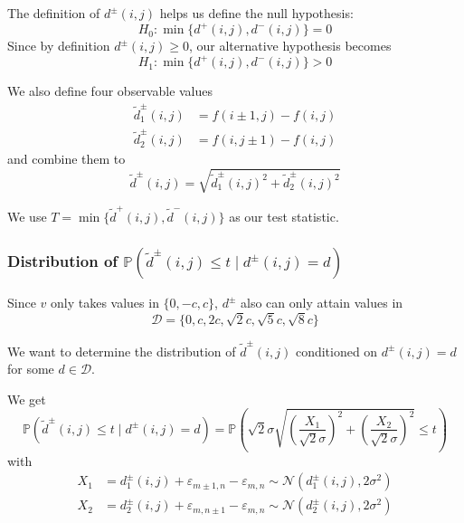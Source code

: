 \documentclass{beamer}
\begin{document}
\begin{frame}
	The definition of $d^\pm(i, j)$ helps us define the null hypothesis:
	\begin{equation*}
		H_0 : \min\{ d^+(i, j), d^-(i, j) \} = 0
	\end{equation*}
	Since by definition $d^\pm(i, j) \geq 0$, our alternative hypothesis becomes
	\begin{equation*}
		H_1 : \min\{ d^+(i, j), d^-(i, j) \} > 0
	\end{equation*}
\end{frame}

\begin{frame}
	We also define four observable values
	\begin{align*}
		\tilde{d}^\pm_1(i, j) &= f(i \pm 1, j) - f(i, j) \\
		\tilde{d}^\pm_2(i, j) &= f(i, j \pm 1) - f(i, j)
	\end{align*}
	and combine them to
	\begin{equation*}\label{d_tilde}
		\tilde{d}^\pm(i, j) = \sqrt{\tilde{d}_1^\pm(i, j)^2 + \tilde{d}_2^\pm(i, j)^2}
	\end{equation*}
	
	We use $T = \min \{ \tilde{d}^+(i, j), \tilde{d}^-(i, j) \}$ as our test statistic.
\end{frame}

\subsubsection{Distribution of $\mathbb{P}(\tilde{d}^\pm(i, j) \leq t \mid d^\pm(i, j) = d)$}

\begin{frame}
	Since $v$ only takes values in $\{ 0, -c, c \}$, $d^\pm$ also can only attain values in
	\begin{equation*}
		\mathcal{D} = \{ 0, c, 2 c, \sqrt{2} c, \sqrt{5} c, \sqrt{8} c \}
	\end{equation*}
	
	We want to determine the distribution of $\tilde{d}^\pm(i, j)$ conditioned on $d^\pm(i, j) = d$ for some $d \in \mathcal{D}$.
\end{frame}

\begin{frame}
	We get
	\begin{equation*}
		\mathbb{P}(\tilde{d}^\pm(i, j) \leq t \mid d^\pm(i, j) = d) = \mathbb{P}\left( \sqrt{2} \sigma \sqrt{\left( \frac{X_1}{\sqrt{2} \sigma} \right)^2 + \left( \frac{X_2}{\sqrt{2} \sigma} \right)^2} \leq t \right)
	\end{equation*}
	with
	\begin{align*}
		X_1 &= d_1^\pm(i, j) + \varepsilon_{m \pm 1, n} - \varepsilon_{m, n} \sim \mathcal{N}(d_1^\pm(i, j), 2 \sigma^2) \\
		X_2 &= d_2^\pm(i, j) + \varepsilon_{m, n \pm 1} - \varepsilon_{m, n} \sim \mathcal{N}(d_2^\pm(i, j), 2 \sigma^2)
	\end{align*}
\end{frame}
\end{document}
